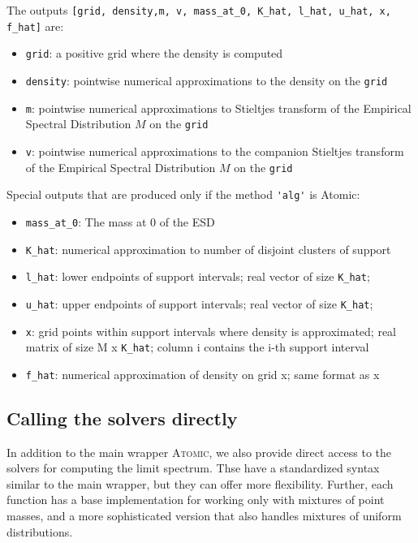 \documentclass[english,11pt]{article} %
\begin{document}
The outputs \verb+[grid, density,m, v, mass_at_0, K_hat, l_hat, u_hat, x, f_hat]+ are: 

\begin{itemize}
\item \verb+grid+: a positive grid where the density is computed
\item \verb+density+: pointwise numerical approximations to the density on the \verb+grid+
\item \verb+m+: pointwise numerical approximations to Stieltjes transform of the Empirical Spectral Distribution $M$ on the \verb+grid+
\item \verb+v+: pointwise numerical approximations to the companion Stieltjes transform of the Empirical Spectral Distribution $M$ on the \verb+grid+
\end{itemize}

Special outputs that are produced only if the method \verb+'alg'+ is Atomic: 
\begin{itemize}
\item \verb+mass_at_0+: The mass at 0 of the ESD
\item \verb+K_hat+: numerical approximation to number of disjoint clusters of support
\item \verb+l_hat+: lower endpoints of support intervals; real vector of size \verb+K_hat+;
\item \verb+u_hat+: upper endpoints of support intervals; real vector of size \verb+K_hat+;
\item \verb+x+: grid points within support intervals where density is approximated;
      real matrix of size M x \verb+K_hat+; column i contains the i-th support
     interval
\item \verb+f_hat+: numerical approximation of density on grid x; same format as x
\end{itemize}

\subsection{Calling the solvers directly}

In addition to the main wrapper \textsc{Atomic}, we also provide direct access to the solvers for computing the limit spectrum. Thse have a standardized syntax similar to the main wrapper, but they can offer more flexibility. Further, each function has a base implementation for working only with mixtures of point masses, and a more sophisticated version that also handles mixtures of uniform distributions.
\end{document}
